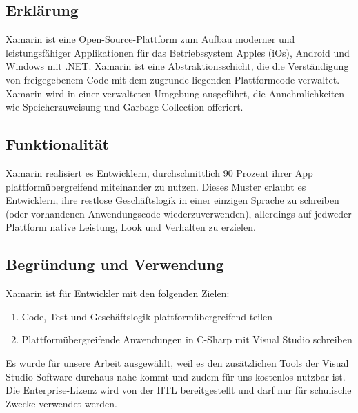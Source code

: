 \subsection*{Erklärung}
Xamarin ist eine Open-Source-Plattform zum Aufbau moderner 
und leistungsfähiger Applikationen für das Betriebssystem Apples (iOs), 
Android und Windows mit .NET. Xamarin ist eine Abstraktionsschicht, 
die die Verständigung von freigegebenem Code mit dem zugrunde liegenden 
Plattformcode verwaltet. Xamarin wird in einer verwalteten Umgebung 
ausgeführt, die Annehmlichkeiten wie Speicherzuweisung und Garbage 
Collection offeriert.
\subsection*{Funktionalität}
Xamarin realisiert es Entwicklern, durchschnittlich 90 Prozent ihrer App 
plattformübergreifend miteinander zu nutzen. Dieses Muster erlaubt es 
Entwicklern, ihre restlose Geschäftslogik in einer einzigen Sprache 
zu schreiben (oder vorhandenen Anwendungscode wiederzuverwenden), 
allerdings auf jedweder Plattform native Leistung, Look und Verhalten 
zu erzielen.
\subsection*{Begründung und Verwendung}
Xamarin ist für Entwickler mit den folgenden Zielen:
\begin{enumerate}
    \item Code, Test und Geschäftslogik plattformübergreifend teilen
    \item Plattformübergreifende Anwendungen in C-Sharp mit Visual Studio schreiben
\end{enumerate}
Es wurde für unsere Arbeit ausgewählt, weil es den zusätzlichen Tools 
der Visual Studio-Software durchaus nahe kommt und zudem für uns kostenlos 
nutzbar ist. Die Enterprise-Lizenz wird von der HTL bereitgestellt und 
darf nur für schulische Zwecke verwendet werden.